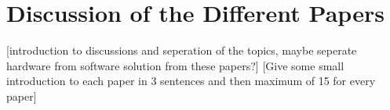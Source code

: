 
\section{Discussion of the Different Papers}

[introduction to discussions and seperation of the topics, maybe seperate hardware from software solution from these papers?]
[Give some small introduction to each paper in 3 sentences and then maximum of 15 for every paper]
\\
\\
\\




